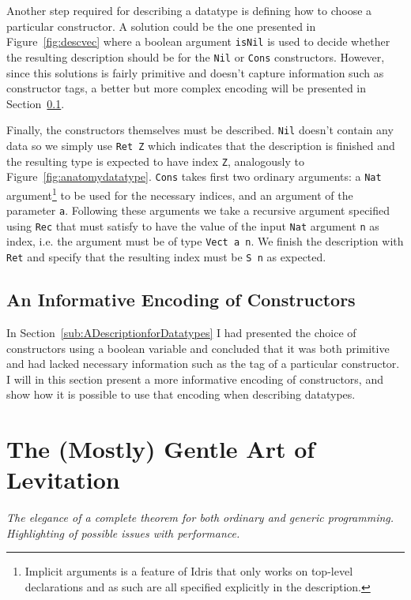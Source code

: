 \documentclass{ituthesis}
\begin{document}
Another step required for describing a datatype is defining how to choose a particular constructor.
A solution could be the one presented in Figure~\ref{fig:descvec} where a boolean argument \texttt{isNil} is used to decide whether the resulting description should be for the \texttt{Nil} or \texttt{Cons} constructors.
However, since this solutions is fairly primitive and doesn't capture information such as constructor tags, a better but more complex encoding will be presented in Section~\ref{sub:AnInformativeEncodingofConstructors}.

Finally, the constructors themselves must be described.
\texttt{Nil} doesn't contain any data so we simply use \texttt{Ret Z} which indicates that the description is finished and the resulting type is expected to have index \texttt{Z}, analogously to Figure~\ref{fig:anatomydatatype}.
\texttt{Cons} takes first two ordinary arguments: a \texttt{Nat} argument\footnote{Implicit arguments is a feature of Idris that only works on top-level declarations and as such are all specified explicitly in the description.} to be used for the necessary indices, and an argument of the parameter \texttt{a}. Following these arguments we take a recursive argument specified using \texttt{Rec} that must satisfy to have the value of the input \texttt{Nat} argument \texttt{n} as index, i.e. the argument must be of type \texttt{Vect a n}. We finish the description with \texttt{Ret} and specify that the resulting index must be \texttt{S n} as expected.

\subsection{An Informative Encoding of Constructors}
\label{sub:AnInformativeEncodingofConstructors}
In Section~\ref{sub:ADescriptionforDatatypes} I had presented the choice of constructors using a boolean variable and concluded that it was both primitive and had lacked
necessary information such as the tag of a particular constructor. I will in this section present a more informative encoding of constructors, and show how it is possible to use that encoding when describing datatypes.

\section{The (Mostly) Gentle Art of Levitation}
\label{sec:TheMostlyGentleArtofLevitation}
\textit{The elegance of a complete theorem for both ordinary and generic programming. Highlighting of possible issues with performance.}
\end{document}
